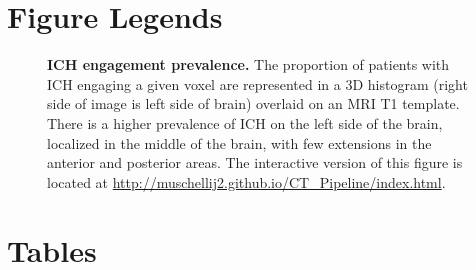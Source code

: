 \documentclass[12pt]{article}\usepackage[]{graphicx}\usepackage[]{color}
\newif\ifseverity
\begin{document}
\clearpage
\newpage
\thispagestyle{empty}
\pagestyle{plain}

\section*{Figure Legends}


\begin{figure}[H]
\centering
  \subfloat{
  \label{prop:img}
}

\caption{{\bf ICH engagement prevalence.} The proportion of patients with ICH engaging a given voxel are represented in a 3D histogram (right side of image is left side of brain) overlaid on an MRI T1 template. There is a higher prevalence of ICH on the left side of the brain, localized in the middle of the brain, with few extensions in the anterior and posterior areas. The interactive version of this figure is located at \url{http://muschellij2.github.io/CT_Pipeline/index.html}.}
  \label{fig:StrokeHist}
\end{figure}

\ifseverity
\begin{figure}[H]
\centering
  \hfill
  \subfloat{
 \label{pvals:nihss}
 }
  \hfill
  \subfloat{
 \label{pvals:gcs}
 } 
 \newline
  \hfill
  \subfloat{
 \label{pvals:regnihss}
 }
  \hfill
  \subfloat{
 \label{pvals:reggcs}
 } 
 \newline 
  \caption{{\bf Highest Predictive Region (HPR) Analysis.}  Panels~\protect\subref{pvals:nihss} and~\protect\subref{pvals:gcs} correspond to the HPR for the top-performing model for NIHSS and GCS scores.  The HPR in \protect\subref{pvals:nihss} represents a p-value threshold of $.0100$ ($19047$ voxels) for the voxel-wise p-value of ICH on NIHSS. The HPR in \protect\subref{pvals:gcs} represents $1000$ with the lowest p-values for the voxel-wise ICH on GCS score regressions.
    Panels~\protect\subref{pvals:regnihss} and~\protect\subref{pvals:reggcs} plot the relationship of the HPR coverage and severity score.  The red line represents a linear fit, the blue line--a LOESS fit.  The larger the HPR coverage the higher (more severe) the NIHSS and the lower (deeper unconsciousness) the GCS.
}
  \label{f:roi}
\end{figure}
\fi

\newpage

\section*{Tables}
\end{document}

